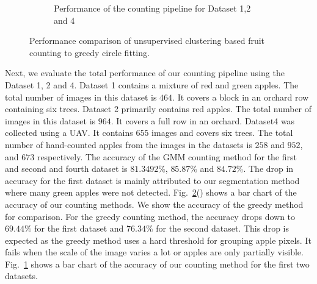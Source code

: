 \begin{figure}[tbp]
\begin{subfigure}[b]{.9\textwidth}
                     \caption{Performance of the counting pipeline for Dataset 1,2 and 4}
                     \label{fig:grossres}
        \end{subfigure}
   \caption[Performance comparison of unsupervised clustering based fruit counting to greedy circle fitting.]{Performance comparison of unsupervised clustering based fruit counting to greedy circle fitting.}
   \label{fig:oanalysis}
\end{figure}    


Next, we evaluate the total performance of our counting pipeline using the Dataset 1, 2 and 4. Dataset 1 contains a mixture of red and green apples. The total number of images in this dataset is $464$. It covers a block in an orchard row containing six trees. Dataset 2  primarily contains red apples. The total number of images in this dataset is $964$. It covers a full row in an orchard. Dataset4 was collected using a UAV. It contains $655$ images and covers six trees. The total number of hand-counted apples from the images in the datasets is $258$ and $952$, and $673$ respectively. The accuracy of the GMM counting method for the first and second and fourth dataset is $81.3492\%$, $85.87\%$ and $84.72\%$. The drop in accuracy for the first dataset is mainly attributed to our segmentation method~\cite{techreportroy} where many green apples were not detected. Fig.~\ref{fig:oanalysis}() shows a bar chart of the accuracy of our counting methods. We show the accuracy of the greedy method for comparison. For the greedy counting method, the accuracy drops down to $69.44\%$ for the first dataset and $76.34\%$ for the second dataset. This drop is expected as the greedy method uses a hard threshold for grouping apple pixels. It fails when the scale of the image varies a lot or apples are only partially visible. Fig.~\ref{fig:grossres} shows a bar chart of the accuracy of our counting method for the first two datasets.



%        
%        
%
